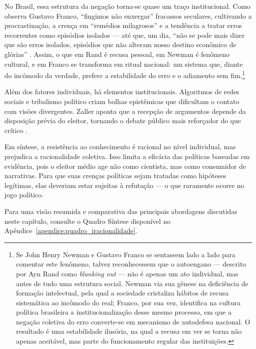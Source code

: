 No Brasil, essa estrutura da negação torna-se quase um traço institucional. Como observa Gustavo Franco, “fingimos não enxergar” fracassos seculares, cultivando a procrastinação, a crença em “remédios milagrosos” e a tendência a tratar erros recorrentes como episódios isolados — até que, um dia, “não se pode mais dizer que são erros isolados, episódios que não alteram nosso destino econômico de glórias” \cite[p.~38-39]{franco2021licoes}. Assim, o que em Rand é recusa pessoal, em Newman é fenômeno cultural, e em Franco se transforma em ritual nacional: um sistema que, diante do incômodo da verdade, prefere a estabilidade do erro e o adiamento sem fim.\footnote{Se John Henry Newman e Gustavo Franco se sentassem lado a lado para comentar este fenômeno, talvez reconhecessem que o autoengano — descrito por Ayn Rand como \textit{blanking out} — não é apenas um ato individual, mas antes de tudo uma estrutura social. Newman via sua gênese na deficiência de formação intelectual, pela qual a sociedade cristaliza hábitos de recusa sistemática ao incômodo do real; Franco, por sua vez, identifica na cultura política brasileira a institucionalização desse mesmo processo, em que a negação coletiva do erro converte-se em mecanismo de autodefesa nacional. O resultado é uma estabilidade ilusória, na qual a recusa em ver se torna não apenas aceitável, mas parte do funcionamento regular das instituições.}

Além dos fatores individuais, há elementos institucionais. Algoritmos de redes sociais e tribalismo político criam bolhas epistêmicas que dificultam o contato com visões divergentes. Zaller aponta que a recepção de argumentos depende da disposição prévia do eleitor, tornando o debate público mais reforçador do que crítico \cite{zaller1992nature}.

Em síntese, a resistência ao conhecimento é racional no nível individual, mas prejudica a racionalidade coletiva. Isso limita a eficácia das políticas baseadas em evidência, pois o eleitor médio age não como cientista, mas como consumidor de narrativas. Para que suas crenças políticas sejam tratadas como hipóteses legítimas, elas deveriam estar sujeitas à refutação — o que raramente ocorre no jogo político.


Para uma visão resumida e comparativa das principais abordagens discutidas neste capítulo, consulte o Quadro Síntese disponível no Apêndice~\ref{apendice:quadro_iracionalidade}.

